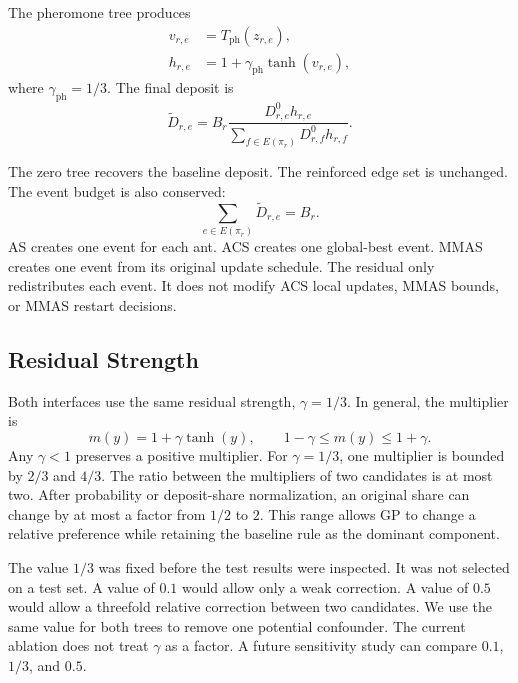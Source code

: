 \documentclass[letterpaper,journal]{IEEEtran}
\begin{document}
The pheromone tree produces
\begin{align}
    v_{r,e} &= T_{\mathrm{ph}}(z_{r,e}),\\
    h_{r,e} &= 1+\gamma_{\mathrm{ph}}\tanh(v_{r,e}),
\end{align}
where \(\gamma_{\mathrm{ph}}=1/3\).
The final deposit is
\begin{equation}
    \widetilde{D}_{r,e}
    =
    B_r
    \frac{D^0_{r,e}h_{r,e}}
    {\sum_{f\in E(\pi_r)}D^0_{r,f}h_{r,f}}.
    \label{eq:pheromone-residual}
\end{equation}

The zero tree recovers the baseline deposit.
The reinforced edge set is unchanged.
The event budget is also conserved:
\begin{equation}
    \sum_{e\in E(\pi_r)}\widetilde{D}_{r,e}=B_r.
\end{equation}
AS creates one event for each ant.
ACS creates one global-best event.
MMAS creates one event from its original update schedule.
The residual only redistributes each event.
It does not modify ACS local updates, MMAS bounds, or MMAS restart decisions.

\subsection{Residual Strength}

Both interfaces use the same residual strength, \(\gamma=1/3\).
In general, the multiplier is
\begin{equation}
    m(y)=1+\gamma\tanh(y),
    \qquad
    1-\gamma\leq m(y)\leq1+\gamma.
    \label{eq:residual-radius}
\end{equation}
Any \(\gamma<1\) preserves a positive multiplier.
For \(\gamma=1/3\), one multiplier is bounded by \(2/3\) and \(4/3\).
The ratio between the multipliers of two candidates is at most two.
After probability or deposit-share normalization, an original share can change
by at most a factor from \(1/2\) to \(2\).
This range allows GP to change a relative preference while retaining the
baseline rule as the dominant component.

The value \(1/3\) was fixed before the test results were inspected.
It was not selected on a test set.
A value of \(0.1\) would allow only a weak correction.
A value of \(0.5\) would allow a threefold relative correction between two
candidates.
We use the same value for both trees to remove one potential confounder.
The current ablation does not treat \(\gamma\) as a factor.
A future sensitivity study can compare \(0.1\), \(1/3\), and \(0.5\).
\end{document}
